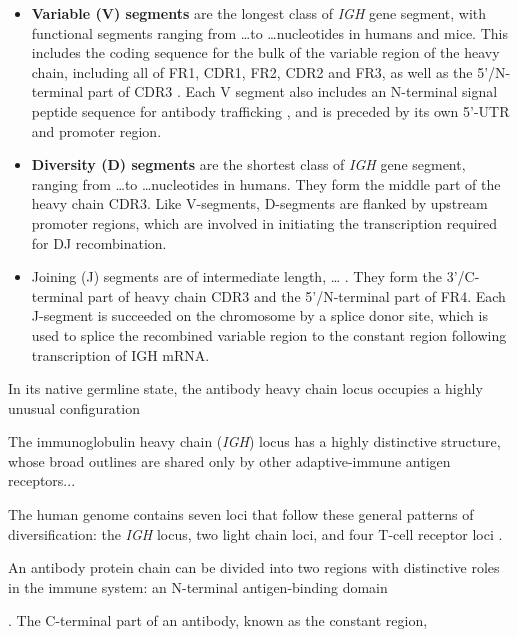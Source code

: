 \begin{itemize}
\item \textbf{Variable (V) segments} are the longest class of \textit{IGH} gene segment, with functional segments ranging from \dots to \dots nucleotides in humans and mice. %
This includes the coding sequence for the bulk of the variable region of the heavy chain, including all of FR1, CDR1, FR2, CDR2 and FR3, as well as the 5'/N-terminal part of CDR3 \citep{jung2006vdjr}. Each V segment also includes an N-terminal signal peptide sequence for antibody trafficking %
, and is preceded by its own 5'-UTR and promoter region. %
\item \textbf{Diversity (D) segments} are the shortest class of \textit{IGH} gene segment, ranging from \dots to \dots nucleotides in humans. %
They form the middle part of the heavy chain CDR3. Like V-segments, D-segments are flanked by upstream promoter regions, which are involved in initiating the transcription required for DJ recombination. \citep{jung2006vdjr}
\item{Joining (J) segments} are of intermediate length, \dots %
. They form the 3'/C-terminal part of heavy chain CDR3 and the 5'/N-terminal part of FR4. Each J-segment is succeeded on the chromosome by a splice donor site, which is used to splice the recombined variable region to the constant region following transcription of IGH mRNA.
\end{itemize}

In its native germline state, the antibody heavy chain locus occupies a highly unusual configuration



The immunoglobulin heavy chain (\textit{IGH}) locus has a highly distinctive structure, whose broad outlines are shared only by other adaptive-immune antigen receptors...

The human genome contains seven loci that follow these general patterns of diversification: the \textit{IGH} locus, two light chain loci, and four T-cell receptor loci \citep{jung2006vdjr}.




An antibody protein chain can be divided into two regions with distinctive roles in the immune system: an N-terminal antigen-binding domain

. The C-terminal part of an antibody, known as the constant region, 

